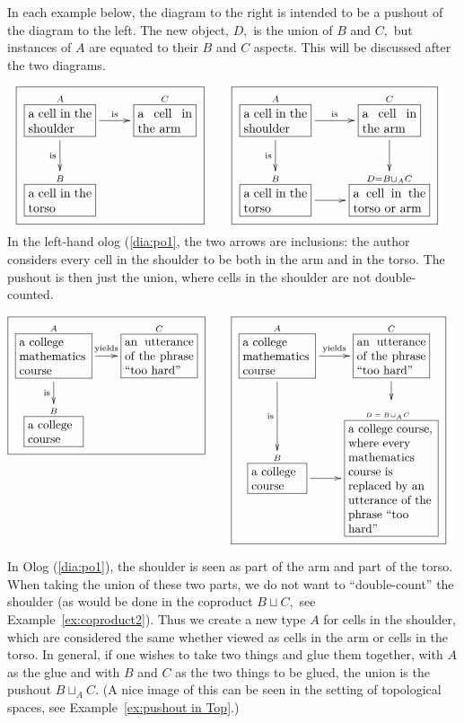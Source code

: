 \documentclass[../main/CT4S-EN-RU]{subfiles}
\begin{document}
\begin{exampleENG}[Pushout]\label{ex:pushout}
In each example below, the diagram to the right is intended to be a pushout of the diagram to the left.  The new object, $D,$ is the union of $B$ and $C,$ but instances of $A$ are equated to their $B$ and $C$ aspects.  This will be discussed after the two diagrams.

\begin{align}
\label{dia:po1}\fbox{\xymatrixnocompile{\obox{A}{.7in}{a cell in the shoulder}\LA{r}{is}\LAL{d}{is}&\obox{C}{.6in}{a cell in the arm}\\\obox{B}{.7in}{a cell in the torso}}}\hsp&\fbox{\xymatrix{\obox{A}{.7in}{a cell in the shoulder}\LA{r}{is}\LAL{d}{is}&\obox{C}{.6in}{a cell in the arm}\LA{d}{}\\\obox{B}{.7in}{a cell in the torso}\LA{r}{}&\obox{D=B\sqcup_AC}{.8in}{a cell in the torso or arm}}}
\end{align}
In the left-hand olog (\ref{dia:po1}, the two arrows are inclusions: the author considers every cell in the shoulder to be both in the arm and in the torso. The pushout is then just the union, where cells in the shoulder are not double-counted.

\begin{align}\label{dia:po2}\fbox{\xymatrixnocompile@=18pt{\obox{A}{.8in}{\raggedright a college mathematics course}\LA{r}{yields}\LAL{d}{is}&\obox{C}{.8in}{an utterance of the phrase “too hard”}\\\obox{B}{.6in}{\raggedright a college course}}}\hsp&\fbox{\xymatrixnocompile@=18pt{\obox{A}{.8in}{\raggedright a college mathematics course}\LA{r}{yields}\LAL{d}{is}&\obox{C}{.8in}{an utterance of the phrase “too hard”}\LA{d}{}\\\obox{B}{.6in}{\raggedright a college course}\LA{r}{}&\obox{\parbox{.6in}{\vspace{.1in}\tiny$D=B\!\sqcup_A\!C$}}{1in}{\raggedright a college course, where every mathematics course is replaced by an utterance of the phrase “too hard”}}}
\end{align}

In Olog (\ref{dia:po1}), the shoulder is seen as part of the arm and part of the torso.  When taking the union of these two parts, we do not want to “double-count” the shoulder (as would be done in the coproduct $B\sqcup C,$ see Example~\ref{ex:coproduct2}).  Thus we create a new type $A$ for cells in the shoulder, which are considered the same whether viewed as cells in the arm or cells in the torso.  In general, if one wishes to take two things and glue them together, with $A$ as the glue and with $B$ and $C$ as the two things to be glued, the union is the pushout $B\sqcup_AC.$ (A nice image of this can be seen in the setting of topological spaces, see Example~\ref{ex:pushout in Top}.)


\end{exampleENG}
\end{document}
